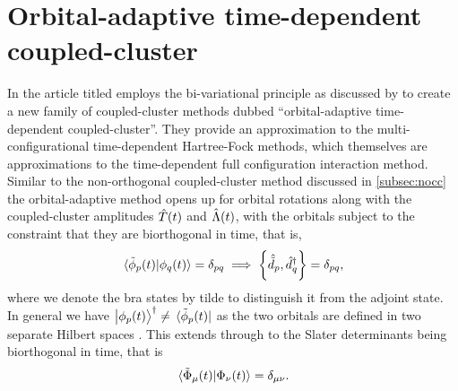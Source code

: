     \section{Orbital-adaptive time-dependent coupled-cluster}
        \label{sec:oatdcc}
        In the article titled 
        \citeauthor{kvaal2012ab} \cite{kvaal2012ab} employs the
        bi-variational principle as discussed by \citeauthor{arponen1983311}
        \cite{arponen1983311} to create a new family of coupled-cluster
        methods dubbed ``orbital-adaptive time-dependent
        coupled-cluster''.
        They provide an approximation to the multi-configurational
        time-dependent Hartree-Fock methods, which themselves are
        approximations to the time-dependent full configuration interaction
        method.
        Similar to the non-orthogonal coupled-cluster method discussed in
        \autoref{subsec:nocc} the orbital-adaptive method opens up for
        orbital rotations along with the coupled-cluster amplitudes
        $\hat{T}(t)$ and $\hat{\Lambda}(t)$, with the orbitals subject to the
        constraint that they are biorthogonal in time, that is,
        \begin{align}
            \braket*{\tilde{\phi}_p(t)}{\phi_q(t)} = \delta_{pq}
            \implies
            \left\{\hat{\tilde{d}}_{p}, \hat{d}^{\dagger}_{q}\right\}
            = \delta_{pq},
        \end{align}
        where we denote the bra states by tilde to distinguish it from the
        adjoint state.
        In general we have $\ket{\phi_p(t)}^{\dagger} \neq
        \bra*{\tilde{\phi}_p(t)}$ as the two orbitals are defined in two
        separate Hilbert spaces \cite{kvaal2012ab}.
        This extends through to the Slater determinants being biorthogonal
        in time, that is
        \begin{align}
            \braket*{\tilde{\Phi}_{\mu}(t)}{\Phi_{\nu}(t)}
            = \delta_{\mu\nu}.
        \end{align}

